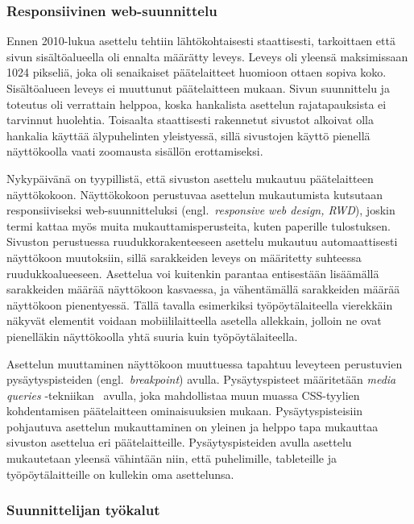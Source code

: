 \documentclass[finnish, 12pt, a4paper, elec, utf8, a-1b, online]{aaltothesis}
\begin{document}
\subsubsection{Responsiivinen web-suunnittelu}\label{responsive-web-design}

Ennen 2010-lukua asettelu tehtiin lähtökohtaisesti staattisesti, tarkoittaen
että sivun sisältöalueella oli ennalta määrätty leveys. Leveys oli yleensä
maksimissaan 1024 pikseliä, joka oli senaikaiset päätelaitteet huomioon ottaen
sopiva koko. Sisältöalueen leveys ei muuttunut päätelaitteen mukaan. Sivun
suunnittelu ja toteutus oli verrattain helppoa, koska hankalista asettelun
rajatapauksista ei tarvinnut huolehtia. Toisaalta staattisesti rakennetut
sivustot alkoivat olla hankalia käyttää älypuhelinten yleistyessä, sillä
sivustojen käyttö pienellä näyttökoolla vaati zoomausta sisällön erottamiseksi.

Nykypäivänä on tyypillistä, että sivuston asettelu mukautuu päätelaitteen
näyttökokoon. Näyttökokoon perustuvaa asettelun mukautumista kutsutaan
responsiiviseksi web-suunnitteluksi (engl.~\textit{responsive web design, RWD}),
joskin termi kattaa myös muita mukauttamisperusteita, kuten paperille
tulostuksen. Sivuston perustuessa ruudukkorakenteeseen asettelu mukautuu
automaattisesti näyttökoon muutoksiin, sillä sarakkeiden leveys on määritetty
suhteessa ruudukkoalueeseen. Asettelua voi kuitenkin parantaa entisestään
lisäämällä sarakkeiden määrää näyttökoon kasvaessa, ja vähentämällä sarakkeiden
määrää näyttökoon pienentyessä. Tällä tavalla esimerkiksi työpöytälaiteella
vierekkäin näkyvät elementit voidaan mobiililaitteella asetella allekkain,
jolloin ne ovat pienelläkin näyttökoolla yhtä suuria kuin työpöytälaiteella.

Asettelun muuttaminen näyttökoon muuttuessa tapahtuu leveyteen perustuvien
pysäytyspisteiden (engl.~\textit{breakpoint}) avulla. Pysäytyspisteet
määritetään \textit{media queries} -tekniikan~\cite{Rivoal:12:MQ} avulla, joka
mahdollistaa muun muassa CSS-tyylien kohdentamisen päätelaitteen ominaisuuksien
mukaan. Pysäytyspisteisiin pohjautuva asettelun mukauttaminen on yleinen ja
helppo tapa mukauttaa sivuston asettelua eri päätelaitteille. Pysäytyspisteiden
avulla asettelu mukautetaan yleensä vähintään niin, että puhelimille,
tableteille ja työpöytälaitteille on kullekin oma asettelunsa.

\subsubsection{Suunnittelijan työkalut}
\end{document}
